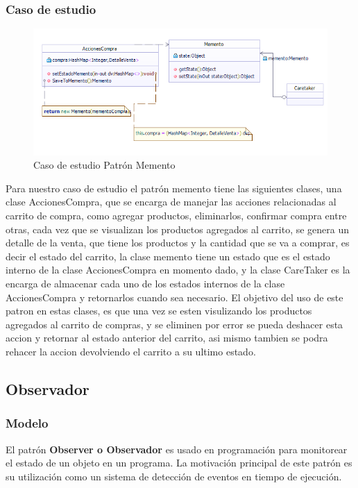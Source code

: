 \subsubsection{Caso de estudio}
\begin{figure}[h!]
	\centering
	\includegraphics[width=0.7\linewidth]{arquitectura/imagenes/PatronMementoCasoEstudio}
	\caption{Caso de estudio Patrón Memento}
	\label{fig:Caso de estudio Patrón Memento}
\end{figure}

Para nuestro caso de estudio el patrón memento tiene las siguientes clases, una clase AccionesCompra, que se encarga de manejar las acciones relacionadas al carrito de compra, como agregar productos, eliminarlos, confirmar compra entre otras, cada vez que se visualizan los productos agregados al carrito, se genera un detalle de la venta, que tiene los productos y la cantidad que se va a comprar, es decir el estado del carrito, la clase memento tiene un estado que es el estado interno de la clase AccionesCompra en momento dado, y la clase CareTaker es la encarga de almacenar cada uno de los estados internos de la clase AccionesCompra y retornarlos cuando sea necesario.\newline
El objetivo del uso de este patron en estas clases, es que una vez se esten visulizando los productos agregados al carrito de compras, y se eliminen por error se pueda deshacer esta accion y retornar al estado anterior del carrito, asi mismo tambien se podra rehacer la accion devolviendo el carrito a su ultimo estado.
\newpage

\subsection{Observador}
\subsubsection{Modelo}

El patrón \textbf{Observer o Observador} es usado en programación para monitorear el estado de un objeto en un programa. La motivación principal de este patrón es su utilización como un sistema de detección de eventos en tiempo de ejecución.

